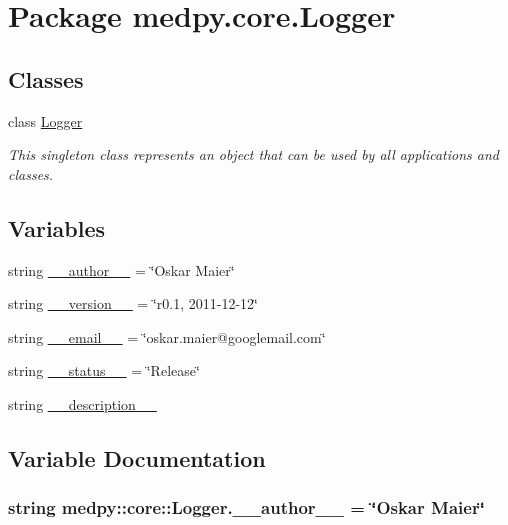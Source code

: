 \hypertarget{namespacemedpy_1_1core_1_1Logger}{
\section{Package medpy.core.Logger}
\label{namespacemedpy_1_1core_1_1Logger}
}
\subsection*{Classes}
\begin{DoxyCompactItemize}
\item 
class \hyperlink{classmedpy_1_1core_1_1Logger_1_1Logger}{Logger}
\begin{DoxyCompactList}\small\item\em This singleton class represents an object that can be used by all applications and classes. \end{DoxyCompactList}\end{DoxyCompactItemize}
\subsection*{Variables}
\begin{DoxyCompactItemize}
\item 
string \hyperlink{namespacemedpy_1_1core_1_1Logger_a9782b9c32d148eb72d0fb5a83a24d32d}{\_\-\_\-author\_\-\_\-} = \char`\"{}Oskar Maier\char`\"{}
\item 
string \hyperlink{namespacemedpy_1_1core_1_1Logger_a7ef28525455e310cb33b01ada30fd041}{\_\-\_\-version\_\-\_\-} = \char`\"{}r0.1, 2011-\/12-\/12\char`\"{}
\item 
string \hyperlink{namespacemedpy_1_1core_1_1Logger_a194b43b8cac541c0456d720696a67177}{\_\-\_\-email\_\-\_\-} = \char`\"{}oskar.maier@googlemail.com\char`\"{}
\item 
string \hyperlink{namespacemedpy_1_1core_1_1Logger_adf582f13c47706399eb00023da58d95f}{\_\-\_\-status\_\-\_\-} = \char`\"{}Release\char`\"{}
\item 
string \hyperlink{namespacemedpy_1_1core_1_1Logger_af5f932a8ea01cd619edca16f8879f36f}{\_\-\_\-description\_\-\_\-}
\end{DoxyCompactItemize}


\subsection{Variable Documentation}
\hypertarget{namespacemedpy_1_1core_1_1Logger_a9782b9c32d148eb72d0fb5a83a24d32d}{
\subsubsection[{\_\-\_\-author\_\-\_\-}]{\setlength{\rightskip}{0pt plus 5cm}string {\bf medpy::core::Logger.\_\-\_\-author\_\-\_\-} = \char`\"{}Oskar Maier\char`\"{}}}
\label{namespacemedpy_1_1core_1_1Logger_a9782b9c32d148eb72d0fb5a83a24d32d}


